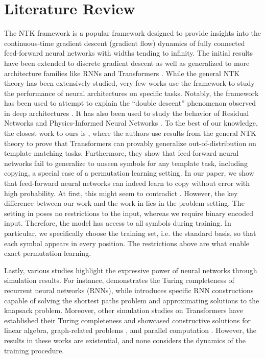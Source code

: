 \section{Literature Review}
The NTK framework \citep{NEURIPS2018_5a4be1fa} is a popular framework designed to provide insights into the continuous-time gradient descent (gradient flow) dynamics of fully connected feed-forward neural networks with widths tending to infinity. The initial results have been extended to discrete gradient descent \citep{NEURIPS2019_0d1a9651} as well as generalized to more architecture families like RNNs and Transformers \citep{yang2020tensorprogramsiineural, yang2021tensorprogramsiibarchitectural}. While the general NTK theory has been extensively studied, very few works use the framework to study the performance of neural architectures on specific tasks. Notably, the framework has been used to attempt to explain the ``double descent'' phenomenon \citep{Nakkiran2020Deep} observed in deep architectures \citep{pmlr-v119-adlam20a, singh2022phenomenology}. It has also been used to study the behavior of Residual Networks \citep{CSIAM-AM-3-4} and Physics-Informed Neural Networks \citep{WANG2022110768}. To the best of our knowledge, the closest work to ours is \cite{boix-adsera2024when}, where the authors use results from the general NTK theory to prove that Transformers can provably generalize out-of-distribution on template matching tasks. Furthermore, they show that feed-forward neural networks fail to generalize to unseen symbols for any template task, including copying, a special case of a permutation learning setting. In our paper, we show that feed-forward neural networks can indeed learn to copy without error with high probability. At first, this might seem to contradict \cite{boix-adsera2024when}. However, the key difference between our work and the work in \cite{boix-adsera2024when} lies in the problem setting. The setting in \cite{boix-adsera2024when} poses no restrictions to the input, whereas we require binary encoded input. Therefore, the model has access to all symbols during training. In particular, we specifically choose the training set, i.e. the standard basis, so that each symbol appears in every position. 
The restrictions above are what enable exact permutation learning.      

Lastly, various studies highlight the expressive power of neural networks through simulation results. For instance, \citet{siegelman95comp} demonstrates the Turing completeness of recurrent neural networks (RNNs), while \citet{hertrich2023provably} introduces specific RNN constructions capable of solving the shortest paths problem and approximating solutions to the knapsack problem. Moreover, other simulation studies on Transformers have established their Turing completeness \citep{perez2021attention, wei2022statistically} and showcased constructive solutions for linear algebra, graph-related problems \citep{giannou23a, pmlr-v235-back-de-luca24a, yang2023looped}, and parallel computation \citep{deluca2025positionalattentionexpressivitylearnability}. However, the results in these works are existential, and none considers the dynamics of the training procedure.